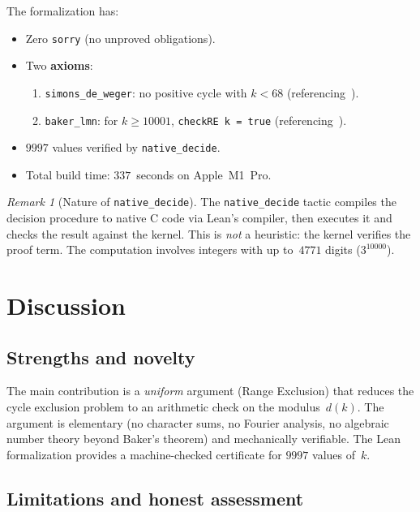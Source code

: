 \documentclass[11pt, a4paper]{amsart}
\theoremstyle{plain}
\theoremstyle{definition}
\theoremstyle{remark}
\newtheorem{remark}[theorem]{Remark}
\begin{document}
The formalization has:
\begin{itemize}
  \item Zero \texttt{sorry} (no unproved obligations).
  \item Two \textbf{axioms}:
    \begin{enumerate}
      \item \texttt{simons\_de\_weger}: no positive cycle with
        $k < 68$ (referencing~\cite{SimonsDeWeger2005}).
      \item \texttt{baker\_lmn}: for $k \geq 10001$,
        \texttt{checkRE k = true} (referencing~\cite{LMN1995}).
    \end{enumerate}
  \item $9997$ values verified by \texttt{native\_decide}.
  \item Total build time: $337$~seconds on Apple~M1~Pro.
\end{itemize}

\begin{remark}[Nature of \texttt{native\_decide}]\label{rem:native}
  The \texttt{native\_decide} tactic compiles the decision
  procedure to native C code via Lean's compiler, then executes it
  and checks the result against the kernel.  This is \emph{not}
  a heuristic: the kernel verifies the proof term.  The computation
  involves integers with up to~$4771$ digits ($3^{10000}$).
\end{remark}

\section{Discussion}\label{sec:discussion}

\subsection{Strengths and novelty}\label{ssec:strengths}

The main contribution is a \emph{uniform} argument
(Range Exclusion) that reduces the cycle exclusion problem
to an arithmetic check on the modulus~$d(k)$.  The argument
is elementary (no character sums, no Fourier analysis, no
algebraic number theory beyond Baker's theorem) and mechanically
verifiable.  The Lean formalization provides a machine-checked
certificate for $9997$ values of~$k$.

\subsection{Limitations and honest assessment}\label{ssec:limits}
\end{document}
